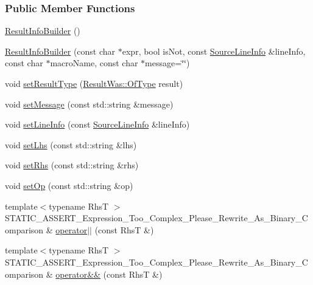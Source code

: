 \subsubsection*{Public Member Functions}
\begin{DoxyCompactItemize}
\item 
\hyperlink{classCatch_1_1ResultInfoBuilder_ac3773fad948e15cf6531a8390e9c092b}{Result\-Info\-Builder} ()
\item 
\hyperlink{classCatch_1_1ResultInfoBuilder_af85c3e1f67e56c3ff22813abc16ac8c9}{Result\-Info\-Builder} (const char $\ast$expr, bool is\-Not, const \hyperlink{structCatch_1_1SourceLineInfo}{Source\-Line\-Info} \&line\-Info, const char $\ast$macro\-Name, const char $\ast$message=\char`\"{}\char`\"{})
\item 
void \hyperlink{classCatch_1_1ResultInfoBuilder_a20541fbc369224e67164fff553e68715}{set\-Result\-Type} (\hyperlink{structCatch_1_1ResultWas_a624e1ee3661fcf6094ceef1f654601ef}{Result\-Was\-::\-Of\-Type} result)
\item 
void \hyperlink{classCatch_1_1ResultInfoBuilder_a8eb2dd49e2440adedcd90dd9314a098e}{set\-Message} (const std\-::string \&message)
\item 
void \hyperlink{classCatch_1_1ResultInfoBuilder_a36f9a34eb1d800ffd8a04460a5d57b64}{set\-Line\-Info} (const \hyperlink{structCatch_1_1SourceLineInfo}{Source\-Line\-Info} \&line\-Info)
\item 
void \hyperlink{classCatch_1_1ResultInfoBuilder_aee7330519d2f6b28036e79ac2a3332ba}{set\-Lhs} (const std\-::string \&lhs)
\item 
void \hyperlink{classCatch_1_1ResultInfoBuilder_abdcad6fff81bfe1de87babefafff25ff}{set\-Rhs} (const std\-::string \&rhs)
\item 
void \hyperlink{classCatch_1_1ResultInfoBuilder_ade067f8b34d51190de9a78b4da738b17}{set\-Op} (const std\-::string \&op)
\item 
{\footnotesize template$<$typename Rhs\-T $>$ }\\S\-T\-A\-T\-I\-C\-\_\-\-A\-S\-S\-E\-R\-T\-\_\-\-Expression\-\_\-\-Too\-\_\-\-Complex\-\_\-\-Please\-\_\-\-Rewrite\-\_\-\-As\-\_\-\-Binary\-\_\-\-Comparison \& \hyperlink{classCatch_1_1ResultInfoBuilder_a895bf3931f5f0540878c830efffbc5c8}{operator$\vert$$\vert$} (const Rhs\-T \&)
\item 
{\footnotesize template$<$typename Rhs\-T $>$ }\\S\-T\-A\-T\-I\-C\-\_\-\-A\-S\-S\-E\-R\-T\-\_\-\-Expression\-\_\-\-Too\-\_\-\-Complex\-\_\-\-Please\-\_\-\-Rewrite\-\_\-\-As\-\_\-\-Binary\-\_\-\-Comparison \& \hyperlink{classCatch_1_1ResultInfoBuilder_a573ec514165f53dd57154f12e9187567}{operator\&\&} (const Rhs\-T \&)
\end{DoxyCompactItemize}
